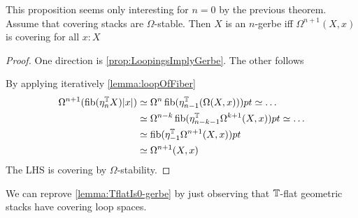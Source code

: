 \documentclass{article}
\newcommand{\EF}{\mathsf{EF}}
\begin{document}
\begin{prop}{\label{prop:GerbeIffLooping}}
	This proposition seems only interesting for $n = 0$ by the previous theorem. Assume that covering stacks are $\Omega$-stable. Then $X$ is an $n$-gerbe iff $\Omega^{n+1}(X,x)$ is covering for all $x: X$	
\end{prop}
\begin{proof}
	One direction is \ref{prop:LoopingsImplyGerbe}. The other follows
	
	By applying iteratively \ref{lemma:loopOfFiber} 
	\begin{align*}
		\Omega^{n+1} (\operatorname{fib} (\eta_n^{\mathbb{T}} X) |x|) &\simeq \Omega^n \operatorname{fib} (\eta_{n-1}^{\mathbb{T}} (\Omega (X,x))) pt \simeq \hdots \\
		&\simeq \Omega^{n-k} \operatorname{fib}(\eta_{n-k-1}^{\mathbb{T}} \Omega^{k+1}(X,x)) pt \simeq \hdots \\
		&\simeq \operatorname{fib} (\eta_{-1}^{\mathbb{T}} \Omega^{n+1} (X,x)) pt \\
		&\simeq \Omega^{n+1} (X , x)
	\end{align*}
	The LHS is covering by $\Omega$-stability.
\end{proof}
We can reprove \ref{lemma:TflatIs0-gerbe} by just observing that $\mathbb{T}$-flat geometric stacks have covering loop spaces. \\
%	
\end{document}
